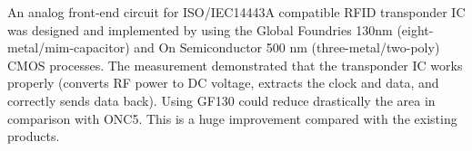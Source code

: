 An analog front-end circuit for ISO/IEC14443A compatible RFID transponder IC was designed and implemented by using the Global Foundries 130nm (eight-metal/mim-capacitor) and On Semiconductor 500 nm (three-metal/two-poly) CMOS processes. The measurement demonstrated that the transponder IC works properly (converts RF power to DC voltage, extracts the clock and data, and correctly sends data back). Using GF130 could reduce drastically the area in comparison with ONC5. This is a huge improvement compared with the existing products.

